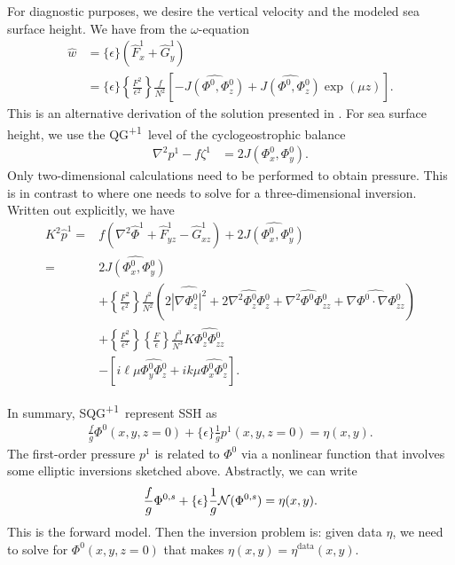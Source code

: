 \documentclass[11pt,letterpaper]{article}
\newcommand{\pl}{\textsuperscript{+1}}
\newcommand{\Ro}{\{\epsilon\}}
\newcommand{\Ubsqrt}{\left\{\frac{F}{\epsilon}\right\}}
\newcommand{\Ub}{\left\{\frac{F^2}{\epsilon^2}\right\}}
\begin{document}
For diagnostic purposes, we desire the vertical velocity and the modeled sea surface height. We have from the $\omega$-equation
\begin{align}
    \hat w &= \Ro(\hat{F}_x^1+\hat{G}_y^1)\\
    &= \Ro\Ub \frac{f}{N^2} \left[-\widehat{J(\Phi^0,\Phi^0_z)} + \widehat{J(\Phi^0,\Phi^0_z)}\exp\left(\mu z\right) \right].
\end{align}
This is an alternative derivation of the solution presented in \citet{LapeyreKlein_06}. For sea surface height, we use the QG\pl~level of the cyclogeostrophic balance
\begin{align}
    \nabla^2 p^1-f\zeta^1 &= 2J(\Phi^0_x,\Phi^0_y).
\end{align}
Only two-dimensional calculations need to be performed to obtain pressure. This is in contrast to \citet[(33)]{MurakiEtAl_99} where one needs to solve for a three-dimensional inversion. Written out explicitly, we have
\begin{align}
    K^2 \hat p^1 =& f(\nabla^2\hat \Phi^1+\hat F^1_{yz}-\hat G^1_{xz})+2\widehat{J(\Phi^0_x,\Phi^0_y)}\\
    =& 2\widehat{J(\Phi^0_x,\Phi^0_y)}\\
    & + \Ub \frac{f^2}{N^2}\left(2\widehat{|\nabla\Phi^0_z|^2}+2\widehat{\nabla^2\Phi^0_z\Phi^0_z}+\widehat{\nabla^2\Phi^0\Phi^0_{zz}}+\widehat{\nabla\Phi^0\cdot\nabla\Phi^0_{zz}}\right)\\
    & + \Ub\Ubsqrt \frac{f^3}{N^3} K\widehat{\Phi^0_z\Phi^0_{zz}} \\
    & - \left[  i\ell \mu \widehat{\Phi^0_y\Phi^0_z}+ik \mu \widehat{\Phi^0_x\Phi^0_z} \right].
\end{align}

In summary, SQG\pl~represent SSH as 
\begin{align}
    \frac{f}{g}\Phi^0(x,y,z=0)+\Ro\frac{1}{g}p^1(x,y,z=0) = \eta(x,y).
\end{align}
The first-order pressure $p^1$ is related to $\Phi^0$ via a nonlinear function that involves some elliptic inversions sketched above. Abstractly, we can write
\begin{align}
    \frac{f}{g}\Phi^{0,s}+\Ro\frac{1}{g}\mcal{N}(\Phi^{0,s}) = \eta(x,y).\label{eq:SQGpl_abs}
\end{align}
This is the forward model. Then the inversion problem is: given data $\eta$, we need to solve for $\Phi^0(x,y,z=0)$ that makes $\eta(x,y) = \eta^\text{data}(x,y)$.
\end{document}
